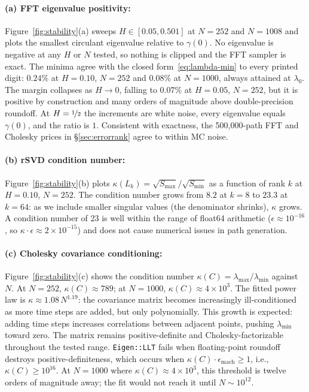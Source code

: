 \paragraph{(a) FFT eigenvalue positivity: }
Figure~\ref{fig:stability}(a) sweeps $H \in [0.05, 0.501]$ at $N = 252$ and
$N = 1008$ and plots the smallest circulant eigenvalue relative to $\gamma(0)$.  No
eigenvalue is negative at any $H$ or $N$ tested, so nothing is clipped and the FFT
sampler is exact.  The minima agree with the closed form~\eqref{eq:lambda-min} to
every printed digit: $0.24\%$ at $H = 0.10$, $N = 252$ and $0.08\%$ at $N = 1000$,
always attained at $\lambda_0$.  The margin collapses as $H \to 0$, falling to
$0.07\%$ at $H = 0.05$, $N = 252$, but it is positive by construction and many orders
of magnitude above double-precision roundoff.  At $H = \nicefrac{1}{2}$ the
increments are white noise, every eigenvalue equals $\gamma(0)$, and the ratio is $1$.
Consistent with exactness, the 500{,}000-path FFT and Cholesky prices in
§\ref{sec:errorrank} agree to within MC noise.

\paragraph{(b) rSVD condition number: }
Figure~\ref{fig:stability}(b) plots $\kappa(L_k) = \sqrt{S_\mathrm{max}} /
\sqrt{S_\mathrm{min}}$ as a function of rank $k$ at $H = 0.10$, $N = 252$.  The
condition number grows from $8.2$ at $k = 8$ to $23.3$ at $k = 64$: as we include
smaller singular values (the denominator shrinks), $\kappa$ grows.  A condition number
of 23 is well within the range of float64 arithmetic ($\epsilon \approx 10^{-16}$,
so $\kappa \cdot \epsilon \approx 2 \times 10^{-15}$) and does not cause numerical
issues in path generation.

\paragraph{(c) Cholesky covariance conditioning: }
Figure~\ref{fig:stability}(c) shows the condition number
$\kappa(C) = \lambda_\mathrm{max} / \lambda_\mathrm{min}$ against $N$.  At $N = 252$, $\kappa(C) \approx 789$; at $N =
1000$, $\kappa(C) \approx 4 \times 10^3$.  The fitted power law is
$\kappa \approx 1.08\,N^{1.19}$: the covariance matrix becomes increasingly
ill-conditioned as more time steps are added, but only polynomially.  This growth is expected: adding time steps increases
correlations between adjacent points, pushing $\lambda_\mathrm{min}$ toward zero.
The matrix remains positive-definite and Cholesky-factorizable throughout the tested
range.  \texttt{Eigen::LLT} fails when floating-point roundoff destroys
positive-definiteness, which occurs when $\kappa(C) \cdot \epsilon_\mathrm{mach}
\geq 1$, i.e., $\kappa(C) \geq 10^{16}$.  At $N = 1000$ where
$\kappa(C) \approx 4 \times 10^3$, this threshold is twelve orders of magnitude
away; the fit would not reach it until $N \sim 10^{12}$.

